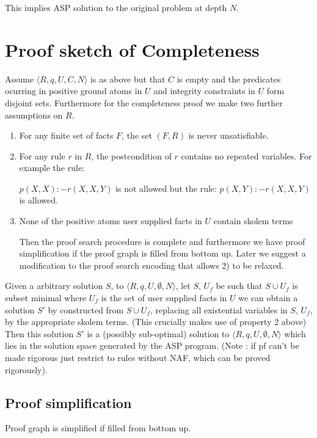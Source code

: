 \documentclass[sigconf]{acmart}
\begin{document}
This implies ASP solution to the original problem at depth $N$.


\section{Proof sketch of Completeness}

Assume $\langle R,q,U,C,N\rangle$ is as above but that $C$ is empty and the predicates ocurring in positive ground atoms in $U$ and integrity constraints in $U$ form disjoint sets. Furthermore for the completeness proof we make two further assumptions on $R$.

\begin{enumerate}
\item For any finite set of facts $F$, the set $(F,R)$ is never unsatisfiable.

\item For any rule $r$ in $R$, the postcondition of $r$ contains no repeated
  variables. For example the rule:
  
$p(X,X):-r(X,X,Y)$ is not allowed but the rule: $p(X,Y):-r(X,X,Y)$ is allowed.

\item None of the positive atoms user supplied facts in $U$ contain skolem terms

Then the proof search procedure is complete and furthermore we have proof simplification if the proof graph is filled from bottom up. Later we suggest a modification to the proof search encoding that allows 2) to be relaxed.
\end{enumerate}

Given a arbitrary solution $S$, to $\langle R,q,U,\emptyset,N\rangle$, let
$S$, $U_{f}$ be such that $S\cup U_{f}$ is subset minimal where $U_{f}$ is the
set of user supplied facts in $U$ we can obtain a solution $S'$ by constructed
from $S\cup U_{f}$, replacing all existential variables in $S$, $U_{f}$, by
the appropriate skolem terms. (This crucially makes use of property 2 above)
Then this solution $S'$ is a (possibly sub-optimal) solution to $\langle
R,q,U,\emptyset,N\rangle$ which lies in the solution space generated by the
ASP program.  (Note : if pf can't be made rigorous just restrict to rules
without NAF, which can be proved rigorously).

\subsection{Proof simplification}
Proof graph is simplified if filled from bottom up.
\end{document}
